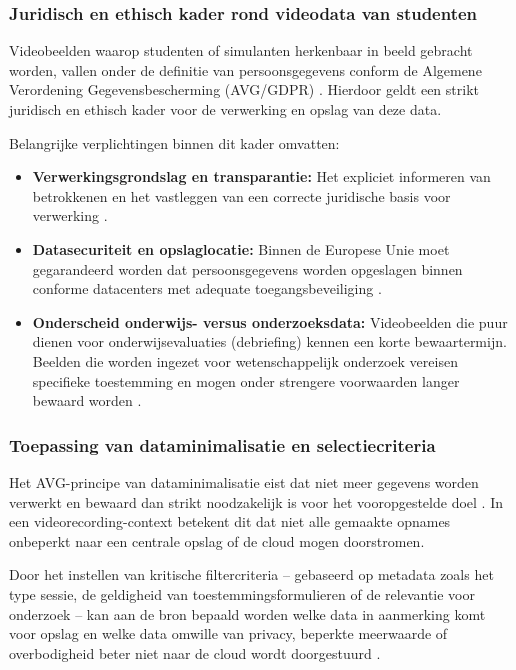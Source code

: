 \subsubsection{Juridisch en ethisch kader rond videodata van studenten}
Videobeelden waarop studenten of simulanten herkenbaar in beeld gebracht worden, vallen onder de definitie van persoonsgegevens conform de Algemene Verordening Gegevensbescherming (AVG/GDPR) \parencite{Sensors2025}. Hierdoor geldt een strikt juridisch en ethisch kader voor de verwerking en opslag van deze data.

Belangrijke verplichtingen binnen dit kader omvatten:
\begin{itemize}
    \item \textbf{Verwerkingsgrondslag en transparantie:} Het expliciet informeren van betrokkenen en het vastleggen van een correcte juridische basis voor verwerking \parencite{Chassang2017}.
    \item \textbf{Datasecuriteit en opslaglocatie:} Binnen de Europese Unie moet gegarandeerd worden dat persoonsgegevens worden opgeslagen binnen conforme datacenters met adequate toegangsbeveiliging \parencite{Sensors2025}.
    \item \textbf{Onderscheid onderwijs- versus onderzoeksdata:} Videobeelden die puur dienen voor onderwijsevaluaties (debriefing) kennen een korte bewaartermijn. Beelden die worden ingezet voor wetenschappelijk onderzoek vereisen specifieke toestemming en mogen onder strengere voorwaarden langer bewaard worden \parencite{CHSU2023}.
\end{itemize}

\subsubsection{Toepassing van dataminimalisatie en selectiecriteria}
Het AVG-principe van dataminimalisatie eist dat niet meer gegevens worden verwerkt en bewaard dan strikt noodzakelijk is voor het vooropgestelde doel \parencite{Chassang2017}. In een videorecording-context betekent dit dat niet alle gemaakte opnames onbeperkt naar een centrale opslag of de cloud mogen doorstromen.

Door het instellen van kritische filtercriteria – gebaseerd op metadata zoals het type sessie, de geldigheid van toestemmingsformulieren of de relevantie voor onderzoek – kan aan de bron bepaald worden welke data in aanmerking komt voor opslag en welke data omwille van privacy, beperkte meerwaarde of overbodigheid beter niet naar de cloud wordt doorgestuurd \parencite{CHSU2023}.

